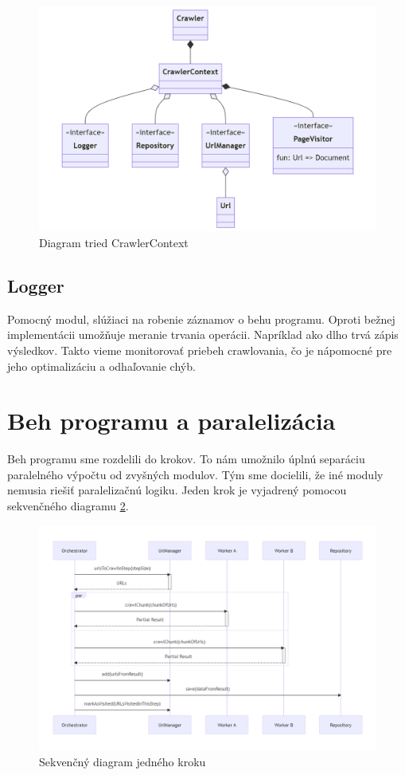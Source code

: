 \begin{figure}[!ht]
    \centering
    \includegraphics[width=1\textwidth]{figures/classDiagramContext.png}
    \caption{Diagram tried CrawlerContext\label{o:classDiagramContextManual}}
\end{figure}


\subsection{Logger}
Pomocný modul, slúžiaci na robenie záznamov o behu programu. Oproti bežnej implementácii umožňuje meranie trvania operácii. Napríklad ako dlho trvá zápis výsledkov. Takto vieme monitorovať priebeh crawlovania, čo je nápomocné pre jeho optimalizáciu a odhaľovanie chýb. 



\section{Beh programu a paralelizácia}
Beh programu sme rozdelili do krokov. To nám umožnilo úplnú separáciu paralelného výpočtu od zvyšných modulov. Tým sme docielili, že iné moduly nemusia riešiť paralelizačnú logiku. Jeden krok je vyjadrený pomocou sekvenčného diagramu \ref{o:seqStepManual}.

\begin{figure}[!ht]
    \centering
    \includegraphics[width=1\textwidth]{figures/seqDiagCrawlStep.png}
    \caption{Sekvenčný diagram jedného kroku\label{o:seqStepManual}}
\end{figure}

